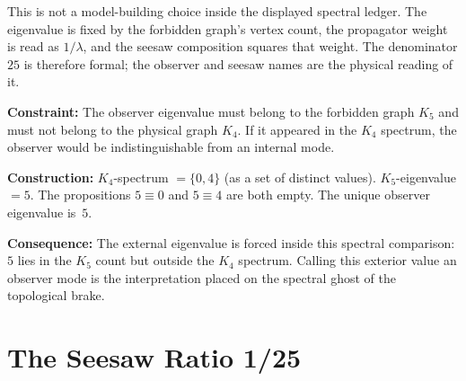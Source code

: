 \documentclass[11pt,a4paper]{book}
\def\texorpdfstring#1#2{#2}%
\begin{document}
This is not a model-building choice inside the displayed spectral ledger.  The
eigenvalue is fixed by the forbidden graph's vertex count, the propagator
weight is read as $1/\lambda$, and the seesaw composition squares that weight.
The denominator $25$ is therefore formal; the observer and seesaw names are the
physical reading of it.

\textbf{Constraint:}
The observer eigenvalue must belong to the forbidden graph $K_5$ and must
not belong to the physical graph $K_4$.  If it appeared in the $K_4$
spectrum, the observer would be indistinguishable from an internal mode.

\textbf{Construction:}
$K_4$-spectrum $= \{0, 4\}$ (as a set of distinct values).
$K_5$-eigenvalue $= 5$.  The propositions $5 \equiv 0$ and $5 \equiv 4$
are both empty.  The unique observer eigenvalue is~$5$.

\textbf{Consequence:}
The external eigenvalue is forced inside this spectral comparison: $5$ lies in
the $K_5$ count but outside the $K_4$ spectrum.  Calling this exterior value an
observer mode is the interpretation placed on the spectral ghost of the
topological brake.


\section{The Seesaw Ratio \texorpdfstring{$1/25$}{1/25}}
\end{document}
